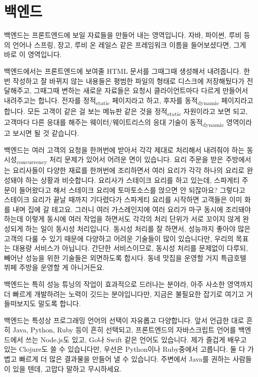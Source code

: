 \documentclass[11pt,a4paper]{article}
\newcommand{\sub}[1]{\textsubscript{#1}}
\begin{document}
\section{백엔드}

백엔드는 프론트엔드에 보일 자료들을 만들어 내는 영역입니다. 자바, 파이썬, 루비 등의 언어나 스프링, 장고, 루비 온 레일스 같은 프레임워크 이름을 들어보셨다면, 그게 바로 이 영역입니다.

백엔드에서는 프론트엔드에 보여줄 HTML 문서를 그때그때 생성해서 내려줍니다. 한번 작성하고 잘 바뀌지 않는 내용들은 평범한 파일의 형태로 디스크에 저장해뒀다가 전달해주고, 그때그때 변하는 새로운 자료들은 요청시 클라이언트마다 다르게 만들어서 내려주고는 합니다. 전자를 정적\sub{static} 페이지라고 하고, 후자를 동적\sub{dynamic} 페이지라고 합니다. 모든 고객이 같은 걸 보는 메뉴판 같은 것을 정적\sub{static} 자원이라고 보면 되고, 고객마다 다른 응대를 해주는 웨이터/웨이트리스의 응대 기술이 동적\sub{dynamic} 영역이라고 보시면 될 것 같습니다.

백엔드는 여러 고객의 요청을 한꺼번에 받아서 각각 제대로 처리해서 내려줘야 하는 동시성\sub{concurrency} 처리 문제가 있어서 어려운 면이 있습니다. 요리 주문을 받은 주방에서는 요리사들이 다양한 재료를 한꺼번에 조리하면서 여러 요리가 각각 하나의 요리로 완성돼야 하는 상황과 비슷합니다. 요리사가 스테이크 요리를 하고 있는데, 스파게티 주문이 들어왔다고 해서 스테이크 요리에 토마토소스를 얹으면 안 되잖아요? 그렇다고 스테이크 요리가 끝날 때까지 기다렸다가 스파게티 요리를 시작하면 고객들은 이미 화를 내며 집에 갈 테고요. 그러니 여러 가스레인지에 여러 요리가 마구 동시에 조리돼야 하는데 이렇게 동시에 여러 작업을 하면서도 각각의 처리 단위가 서로 꼬이지 않게 완성되게 하는 일이 동시성 처리입니다. 동시성 처리를 잘 하면서, 성능까지 좋아야 많은 고객의 다룰 수 있기 때문에 다양하고 어려운 기술들이 많이 있습니다만, 우리의 목표는 대용량 서비스가 아닙니다. 간단한 서비스이므로, 동시성 처리를 문제없이 다루되, 빼어난 성능을 위한 기술들은 외면하도록 합시다. 동네 맛집을 운영할 거지 특급호텔 뷔페 주방을 운영할 게 아니거든요.

백엔드는 특히 성능 튜닝의 작업이 효과적으로 드러나는 분야라, 아주 사소한 영역까지 더 빠르게 개발하려는 노력이 깃드는 분야입니다만, 지금은 불필요한 잡기로 여기고 거들떠보지도 말도록 합니다.

백엔드는 특성상 프로그래밍 언어의 선택이 자유롭고 다양합니다. 앞서 언급한 대로 흔히 \textsf{Java, Python, Ruby} 등이 흔히 선택되고,  프론트엔드의 자바스크립트 언어를 백엔드에서 쓰는 \textsf{Node.js}도 있고, \textsf{Go}나 \textsf{Swift} 같은 언어도 있습니다. 제가 즐겁게 배우고 있는 \textsf{Clojure}도 쓸 수 있습니다만, 우선은 \textsf{Python}이나 \textsf{Ruby}중에서 고릅니다. 둘 다 가볍고 빠르게 더 많은 결과물을 만들어 낼 수 있습니다. 주변에서 \textsf{Java}를 권하는 사람들이 있을 텐데, 고맙다 말하고 무시하세요.
\end{document}
